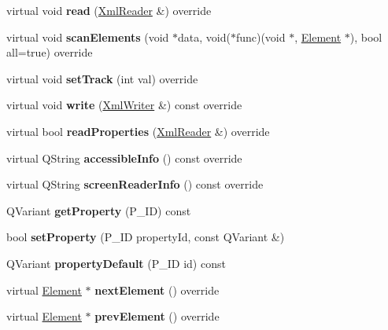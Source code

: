 \begin{DoxyCompactItemize}
\mbox{\label{class_ms_1_1_ambitus_aa77f33a43493cf0e3abdf65d11f513d4}} 
virtual void {\bfseries read} (\hyperlink{class_ms_1_1_xml_reader}{Xml\+Reader} \&) override
\item 
\mbox{\label{class_ms_1_1_ambitus_a2e7142bb190b89ec5c0d51d21f965fbe}} 
virtual void {\bfseries scan\+Elements} (void $\ast$data, void($\ast$func)(void $\ast$, \hyperlink{class_ms_1_1_element}{Element} $\ast$), bool all=true) override
\item 
\mbox{\label{class_ms_1_1_ambitus_ae320a85654d1663043e827ff43b4d059}} 
virtual void {\bfseries set\+Track} (int val) override
\item 
\mbox{\label{class_ms_1_1_ambitus_a36072963c0f8b0a2408dc23c634f14a3}} 
virtual void {\bfseries write} (\hyperlink{class_ms_1_1_xml_writer}{Xml\+Writer} \&) const override
\item 
\mbox{\label{class_ms_1_1_ambitus_ad63838aaef32837f1fb5d1f453ced509}} 
virtual bool {\bfseries read\+Properties} (\hyperlink{class_ms_1_1_xml_reader}{Xml\+Reader} \&) override
\item 
\mbox{\label{class_ms_1_1_ambitus_a82929a539325746300329c8c6465517b}} 
virtual Q\+String {\bfseries accessible\+Info} () const override
\item 
\mbox{\label{class_ms_1_1_ambitus_a2cf4772360686dd0150d938aff02f2fd}} 
virtual Q\+String {\bfseries screen\+Reader\+Info} () const override
\item 
\mbox{\label{class_ms_1_1_ambitus_a8730db55f4b535fd34b8f89715e97e3a}} 
Q\+Variant {\bfseries get\+Property} (P\+\_\+\+ID) const
\item 
\mbox{\label{class_ms_1_1_ambitus_a5590feb5448afab34dc7f7d5ed88b0f8}} 
bool {\bfseries set\+Property} (P\+\_\+\+ID property\+Id, const Q\+Variant \&)
\item 
\mbox{\label{class_ms_1_1_ambitus_a51ea03304fb916091594c8986a84374c}} 
Q\+Variant {\bfseries property\+Default} (P\+\_\+\+ID id) const
\item 
\mbox{\label{class_ms_1_1_ambitus_aab393a6408e2be0ae47ece212a97fab9}} 
virtual \hyperlink{class_ms_1_1_element}{Element} $\ast$ {\bfseries next\+Element} () override
\item 
\mbox{\label{class_ms_1_1_ambitus_a727322b9a7a4afd749e43f12b5c55eef}} 
virtual \hyperlink{class_ms_1_1_element}{Element} $\ast$ {\bfseries prev\+Element} () override
\end{DoxyCompactItemize}
